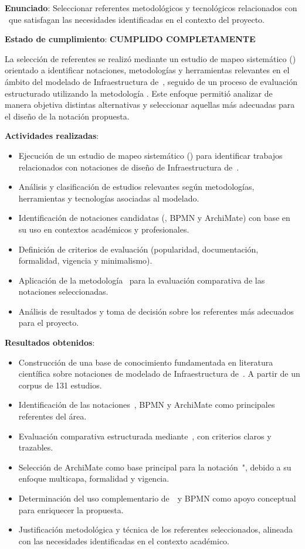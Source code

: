 \textbf{Enunciado}: Seleccionar referentes metodológicos y tecnológicos relacionados con \NDITI~que satisfagan las necesidades identificadas en el contexto del proyecto.

\textbf{Estado de cumplimiento}: \textbf{CUMPLIDO COMPLETAMENTE}

La selección de referentes se realizó mediante un estudio de mapeo sistemático (\SMS) orientado a identificar notaciones, metodologías y herramientas relevantes en el ámbito del modelado de Infraestructura de~\TI, seguido de un proceso de evaluación estructurado utilizando la metodología \DAR. Este enfoque permitió analizar de manera objetiva distintas alternativas y seleccionar aquellas más adecuadas para el diseño de la notación propuesta.

\textbf{Actividades realizadas}:
\begin{itemize}
    \item Ejecución de un estudio de mapeo sistemático (\SMS) para identificar trabajos relacionados con notaciones de diseño de Infraestructura de~\TI.
    \item Análisis y clasificación de estudios relevantes según metodologías, herramientas y tecnologías asociadas al modelado.
    \item Identificación de notaciones candidatas (\UML{}, BPMN y ArchiMate) con base en su uso en contextos académicos y profesionales.
    \item Definición de criterios de evaluación (popularidad, documentación, formalidad, vigencia y minimalismo).
    \item Aplicación de la metodología \DAR~para la evaluación comparativa de las notaciones seleccionadas.
    \item Análisis de resultados y toma de decisión sobre los referentes más adecuados para el proyecto.
\end{itemize}

\textbf{Resultados obtenidos}:
\begin{itemize}
    \item Construcción de una base de conocimiento fundamentada en literatura científica sobre notaciones de modelado de Infraestructura de~\TI. A partir de un corpus de 131 estudios.
    \item Identificación de las notaciones~\UML{}, BPMN y ArchiMate como principales referentes del área.
    \item Evaluación comparativa estructurada mediante~\DAR{}, con criterios claros y trazables.
    \item Selección de ArchiMate como base principal para la notación~\NDITI"{}, debido a su enfoque multicapa, formalidad y vigencia.
    \item Determinación del uso complementario de~\UML~y BPMN como apoyo conceptual para enriquecer la propuesta.
    \item Justificación metodológica y técnica de los referentes seleccionados, alineada con las necesidades identificadas en el contexto académico.
\end{itemize}

